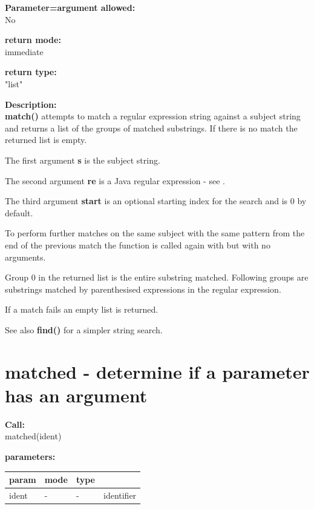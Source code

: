         {\bf Parameter=argument allowed:} \\
        No
        
        {\bf return mode:} \\
        immediate

        {\bf return type:} \\
        "list"
        
        {\bf Description:} \\
        {\bf match()} attempts to match a regular expression string against a
        subject string and returns a list of the groups of matched substrings.
        If there is no match the returned list is empty.
        
        The first argument {\bf s} is the subject string.
        
        The second argument {\bf re} is a Java regular expression - 
        see .
        
        The third argument {\bf start} is an optional starting index for the
        search and is 0 by default.
        
        To perform further matches on the same subject with the same pattern
        from the end of the previous match the function is called again with
        but with no arguments.
        
        Group 0 in the returned list is the entire substring matched. Following
        groups are substrings matched by parenthesised expressions in the
        regular expression.
        
        If a match fails an empty list is returned.
        
        See also {\bf find()}  for a simpler
        string search.




    \section{matched - determine if a parameter has an argument}\label{sec:ifmatched}
        
        
        {\bf Call:} \\
        matched(ident)
        
        {\bf parameters:} \\
        \begin{tabular}{| l | l | l | l |}
        \hline
        param  & mode & type & \\
        \hline \hline
        ident & - &  -  & identifier \\ \hline
        \end{tabular}
        

